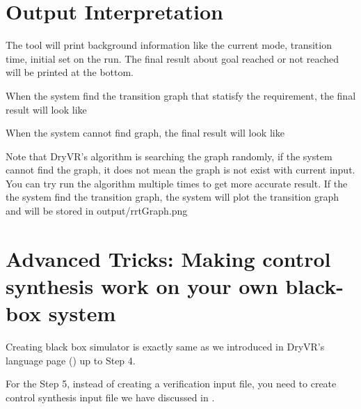 \documentclass[letterpaper,10pt,english]{sphinxmanual}
\begin{document}
\section{Output Interpretation}
\label{\detokenize{dryvr's_control_synthesis:output-interpretation}}
The tool will print background information like the current mode, transition time, initial set on the run. The final result about goal reached or not reached will be printed at the bottom.

When the system find the transition graph that statisfy the requirement, the final result will look like

\begin{sphinxVerbatim}[commandchars=\\\{\}]
 
\end{sphinxVerbatim}

When the system cannot find graph, the final result will look like

\begin{sphinxVerbatim}[commandchars=\\\{\}]
   
\end{sphinxVerbatim}

Note that DryVR's algorithm is searching the graph randomly, if the system cannot find the graph, it does not mean the graph is not exist with current input. You can try run the algorithm multiple times to get more accurate result.
If the the system find the transition graph, the system will plot the transition graph and will be stored in \sphinxquotedblleft{}output/rrtGraph.png\sphinxquotedblright{}


\section{Advanced Tricks: Making control synthesis work on your own black-box system}
\label{\detokenize{dryvr's_control_synthesis:advanced-tricks-making-control-synthesis-work-on-your-own-black-box-system}}
Creating black box simulator is exactly same as we introduced in DryVR's language page ({\hyperref[\detokenize{dryvr's_language:advance-label}]{}}) up to Step 4.

For the Step 5, instead of creating a verification input file, you need to create control synthesis input file we have discussed in {\hyperref[\detokenize{dryvr's_control_synthesis:input-format-control-label}]{}}.
\end{document}
